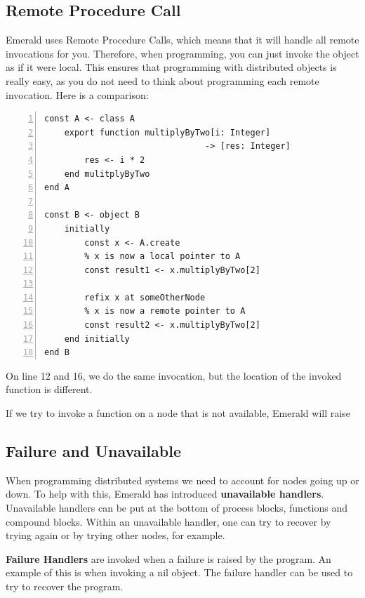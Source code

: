 \subsection{Remote Procedure Call}
Emerald uses Remote Procedure Calls, which means that it will handle all remote invocations for you. Therefore, when programming, you can just invoke the object as if it were local. This ensures that programming with distributed objects is really easy, as you do not need to think about programming each remote invocation. Here is a comparison:
\begin{lstlisting}[language=emerald, numbers=left]
const A <- class A
    export function multiplyByTwo[i: Integer] 
                                -> [res: Integer]
        res <- i * 2
    end mulitplyByTwo
end A

const B <- object B
    initially
        const x <- A.create
        % x is now a local pointer to A
        const result1 <- x.multiplyByTwo[2]
        
        refix x at someOtherNode
        % x is now a remote pointer to A
        const result2 <- x.multiplyByTwo[2] 
    end initially
end B
\end{lstlisting}
On line 12 and 16, we do the same invocation, but the location of the invoked function is different.

If we try to invoke a function on a node that is not available, Emerald will raise 




\subsection{Failure and Unavailable}
When programming distributed systems we need to account for nodes going up or down. To help with this, Emerald has introduced \textbf{unavailable handlers}. Unavailable handlers can be put at the bottom of process blocks, functions and compound blocks. Within an unavailable handler, one can try to recover by trying again or by trying other nodes, for example.

\textbf{Failure Handlers} are invoked when a failure is raised by the program. An example of this is when invoking a nil object. The failure handler can be used to try to recover the program.

